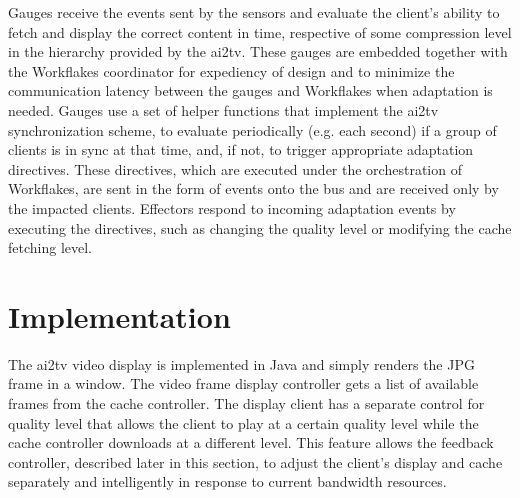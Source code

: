 \documentclass{sig-alternate}
\begin{document}
%
Gauges receive the events sent by the sensors and evaluate the
client's ability to fetch and display the correct content in time,
respective of some compression level in the hierarchy provided by the
ai2tv.  These gauges are embedded together with the Workflakes
coordinator for expediency of design and to minimize the communication
latency between the gauges and Workflakes when adaptation is needed.
Gauges use a set of helper functions that implement the ai2tv
synchronization scheme, to evaluate periodically (e.g. each second) if
a group of clients is in sync at that time, and, if not, to trigger
appropriate adaptation directives.  These directives, which are
executed under the orchestration of Workflakes, are sent in the form
of events onto the bus and are received only by the impacted clients.
Effectors respond to incoming adaptation events by executing the
directives, such as changing the quality level or modifying the cache
fetching level.

% 

\section{Implementation} \label{implementation}

The ai2tv video display is implemented in Java and simply renders the
JPG frame in a window.  The video frame display controller gets a list
of available frames from the cache controller.  The display client has
a separate control for quality level that allows the client to play at
a certain quality level while the cache controller downloads at a
different level.  This feature allows the feedback controller,
described later in this section, to adjust the client's display and
cache separately and intelligently in response to current bandwidth
resources.
\end{document}
